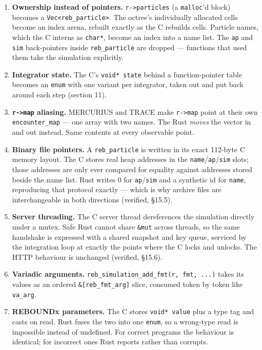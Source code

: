 \documentclass[11pt]{article}
\begin{document}
\begin{enumerate}
\item \textbf{Ownership instead of pointers.} \texttt{r->particles} (a \texttt{malloc}'d block) becomes a \texttt{Vec<reb\_particle>}. The octree's individually allocated cells become an index arena, rebuilt exactly as the C rebuilds cells. Particle names, which the C interns as \texttt{char*}, become an index into a name list. The \texttt{ap} and \texttt{sim} back-pointers inside \texttt{reb\_particle} are dropped --- functions that used them take the simulation explicitly.
\item \textbf{Integrator state.} The C's \texttt{void* state} behind a function-pointer table becomes an \texttt{enum} with one variant per integrator, taken out and put back around each step (section 11).
\item \textbf{\texttt{r->map} aliasing.} MERCURIUS and TRACE make \texttt{r->map} point at their own \texttt{encounter\_map} --- one array with two names. The Rust \emph{moves} the vector in and out instead. Same contents at every observable point.
\item \textbf{Binary file pointers.} A \texttt{reb\_particle} is written in its exact 112-byte C memory layout. The C stores real heap addresses in the \texttt{name}/\texttt{ap}/\texttt{sim} slots; those addresses are only ever compared for equality against addresses stored beside the name list. Rust writes 0 for \texttt{ap}/\texttt{sim} and a synthetic id for \texttt{name}, reproducing that protocol exactly --- which is why archive files are interchangeable in both directions (verified, \S{}15.5).
\item \textbf{Server threading.} The C server thread dereferences the simulation directly under a mutex. Safe Rust cannot share \texttt{\&mut} across threads, so the same handshake is expressed with a shared snapshot and key queue, serviced by the integration loop at exactly the points where the C locks and unlocks. The HTTP behaviour is unchanged (verified, \S{}15.6).
\item \textbf{Variadic arguments.} \texttt{reb\_simulation\_add\_fmt(r, fmt, ...)} takes its values as an ordered \texttt{\&[reb\_fmt\_arg]} slice, consumed token by token like \texttt{va\_arg}.
\item \textbf{REBOUNDx parameters.} The C stores \texttt{void* value} plus a type tag and casts on read. Rust fuses the two into one \texttt{enum}, so a wrong-type read is impossible instead of undefined. For correct programs the behaviour is identical; for incorrect ones Rust reports rather than corrupts.

\end{enumerate}
\end{document}
